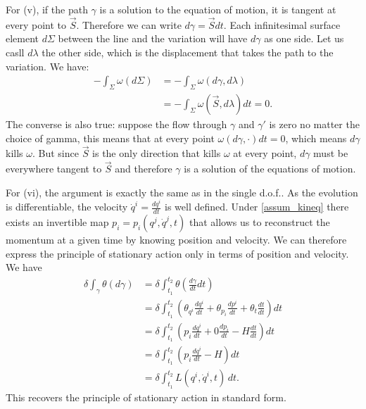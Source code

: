 \documentclass[10pt,twocolumn, nofootinbib]{revtex4-2}
\begin{document}
For (v), if the path $\gamma$ is a solution to the equation of motion, it is tangent at every point to $\vec{S}$. Therefore we can write $d\gamma= \vec{S} dt$. Each infinitesimal surface element $d\Sigma$ between the line and the variation will have $d\gamma$ as one side. Let us casll $d\lambda$ the other side, which is the displacement that takes the path to the variation. We have:
\begin{equation}
\begin{aligned}
	-\int_\Sigma \omega(d\Sigma) &= -\int_\Sigma \omega(d\gamma, d\lambda) \\
	&= -\int_\Sigma \omega(\vec{S}, d\lambda) dt = 0.
\end{aligned}
\end{equation}
The converse is also true: suppose the flow through $\gamma$ and $\gamma'$ is zero no matter the choice of gamma, this means that at every point $\omega(d\gamma, \cdot) dt = 0$, which means $d\gamma$ kills $\omega$. But since $\vec{S}$ is the only direction that kills $\omega$ at every point, $d\gamma$ must be everywhere tangent to $\vec{S}$ and therefore $\gamma$ is a solution of the equations of motion.

For (vi), the argument is exactly the same as in the single d.o.f.. As the evolution is differentiable, the velocity $\dot{q}^i = \frac{dq^i}{dt}$ is well defined. Under \ref{assum_kineq} there exists an invertible map $p_i=p_i(q^j, \dot{q}^j, t)$ that allows us to reconstruct the momentum at a given time by knowing position and velocity. We can therefore express the principle of stationary action only in terms of position and velocity. We have
\begin{equation}
	\begin{aligned}
		\delta \int_\gamma \theta (d\gamma) &= \delta \int^{t_2}_{t_1} \theta \left(\frac{d\gamma}{dt} dt\right) \\
		&= \delta \int^{t_2}_{t_1} \left(\theta_{q^i} \frac{dq^i}{dt} + \theta_{p_i} \frac{dp^i}{dt} + \theta_t \frac{dt}{dt}\right) dt \\
		&= \delta\int^{t_2}_{t_1} \left(p_i \frac{dq^i}{dt} + 0 \frac{dp_i}{dt} - H \frac{dt}{dt}\right) dt \\
		&= \delta \int^{t_2}_{t_1} \left(p_i \frac{dq^i}{dt} - H\right) dt \\
		&= \delta \int^{t_2}_{t_1} L(q^i, \dot{q}^i, t) \, dt.
	\end{aligned}
\end{equation}
This recovers the principle of stationary action in standard form.
\end{document}
